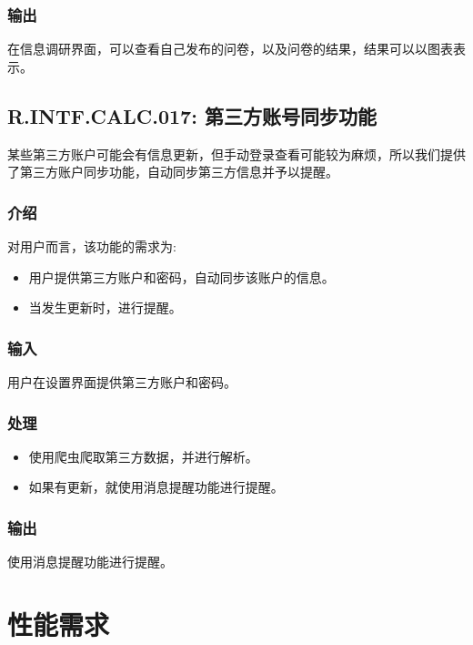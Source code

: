 {\subsubsection{输出}
在信息调研界面，可以查看自己发布的问卷，以及问卷的结果，结果可以以图表表示。

\subsection{\color{red}R.INTF.CALC.017: 第三方账号同步功能}
某些第三方账户可能会有信息更新，但手动登录查看可能较为麻烦，所以我们提供了第三方账户同步功能，自动同步第三方信息并予以提醒。
\subsubsection{介绍}
对用户而言，该功能的需求为:
\begin{itemize}
  \item 用户提供第三方账户和密码，自动同步该账户的信息。
  \item 当发生更新时，进行提醒。
\end{itemize}
\subsubsection{输入}
用户在设置界面提供第三方账户和密码。
\subsubsection{处理}
\begin{itemize}
  \item 使用爬虫爬取第三方数据，并进行解析。
  \item 如果有更新，就使用消息提醒功能进行提醒。
\end{itemize}
\subsubsection{输出}
使用消息提醒功能进行提醒。

}









\section{性能需求}
